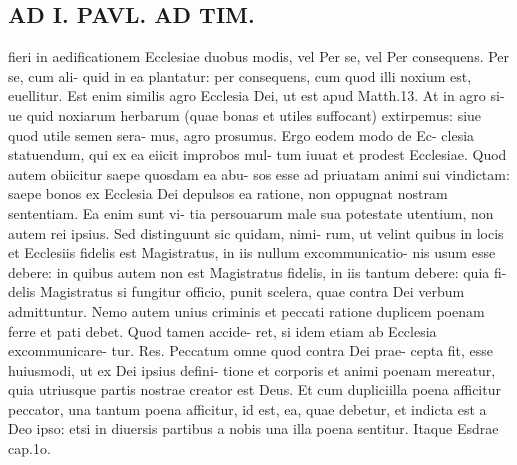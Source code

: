 \documentclass{article}
\begin{document}
\begin{pages}
\section*{AD I. PAVL. AD TIM. }
\marginpar{[ p.30 ]}fieri in aedificationem Ecclesiae duobus modis, vel Per se, vel Per consequens. Per se, cum ali- quid in ea plantatur: per consequens, cum quod illi noxium est, euellitur. Est enim similis agro Ecclesia Dei, ut est apud Matth.13. At in agro si- ue quid noxiarum herbarum (quae bonas et utiles suffocant) extirpemus: siue quod utile semen sera- mus, agro prosumus. Ergo eodem modo de Ec- clesia statuendum, qui ex ea eiicit improbos mul- tum iuuat et prodest Ecclesiae. Quod autem obiicitur saepe quosdam ea abu- sos esse ad priuatam animi sui vindictam: saepe bonos ex Ecclesia Dei depulsos ea ratione, non oppugnat nostram sententiam. Ea enim sunt vi- tia persouarum male sua potestate utentium, non autem rei ipsius. Sed distinguunt sic quidam, nimi- rum, ut velint quibus in locis et Ecclesiis fidelis est Magistratus, in iis nullum excommunicatio- nis usum esse debere: in quibus autem non est Magistratus fidelis, in iis tantum debere: quia fi- delis Magistratus si fungitur officio, punit scelera, quae contra Dei verbum admittuntur. Nemo autem unius criminis et peccati ratione duplicem poenam ferre et pati debet. Quod tamen accide- ret, si idem etiam ab Ecclesia excommunicare- tur. Res. Peccatum omne quod contra Dei prae- cepta fit, esse huiusmodi, ut ex Dei ipsius defini- tione et corporis et animi poenam mereatur, quia utriusque partis nostrae creator est Deus. Et cum dupliciilla poena afficitur peccator, una tantum poena afficitur, id est, ea, quae debetur, et indicta est a Deo ipso: etsi in diuersis partibus a nobis una illa poena sentitur. Itaque Esdrae cap.1o. 

\end{pages}
\end{document}
